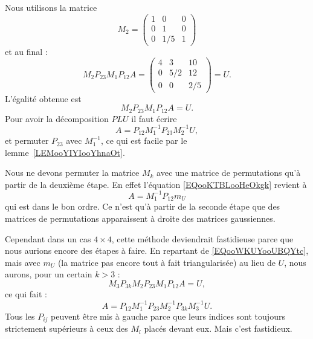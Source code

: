 Nous utilisons la matrice
\begin{equation}
	M_2=\begin{pmatrix}
		1 & 0   & 0 \\
		0 & 1   & 0 \\
		0 & 1/5 & 1
	\end{pmatrix}
\end{equation}
et au final :
\begin{equation}
	M_2P_{23}M_1P_{12}A=\begin{pmatrix}
		4 & 3   & 10  \\
		0 & 5/2 & 12  \\
		0 & 0   & 2/5
	\end{pmatrix}=U.
\end{equation}
L'égalité obtenue est
\begin{equation}
	M_2P_{23}M_1P_{12}A=U.
\end{equation}
Pour avoir la décomposition \( PLU\) il faut écrire
\begin{equation}        \label{EQooWKUYooUBQYtc}
	A=P_{12}M_1^{-1}P_{23}M_2^{-1}U,
\end{equation}
et permuter \( P_{23}\) avec \( M_1^{-1}\), ce qui est facile par le lemme~\ref{LEMooYIYIooYhnaOt}.

\begin{remark}
	Nous ne devons permuter la matrice \( M_k\) avec une matrice de permutations qu'à partir de la deuxième étape. En effet l'équation \eqref{EQooKTBLooHeOkgk} revient à
	\begin{equation}
		A=M_1^{-1}P_{12}m_U
	\end{equation}
	qui est dans le bon ordre. Ce n'est qu'à partir de la seconde étape que des matrices de permutations apparaissent à droite des matrices gaussiennes.
\end{remark}

Cependant dans un cas \( 4\times 4\), cette méthode deviendrait fastidieuse parce que nous aurions encore des étapes à faire. En repartant de \eqref{EQooWKUYooUBQYtc}, mais avec \( m_U\) (la matrice pas encore tout à fait triangularisée) au lieu de \( U\), nous aurons, pour un certain \( k>3\) :
\begin{equation}
	M_3P_{3k}M_2P_{23}M_1P_{12}A=U,
\end{equation}
ce qui fait :
\begin{equation}
	A=P_{12}M_1^{-1}P_{23}M_2^{-1}P_{3k}M_3^{-1}U.
\end{equation}
Tous les \( P_{ij}\) peuvent être mis à gauche parce que leurs indices sont toujours strictement supérieurs à ceux des \( M_l\) placés devant eux. Mais c'est fastidieux.

